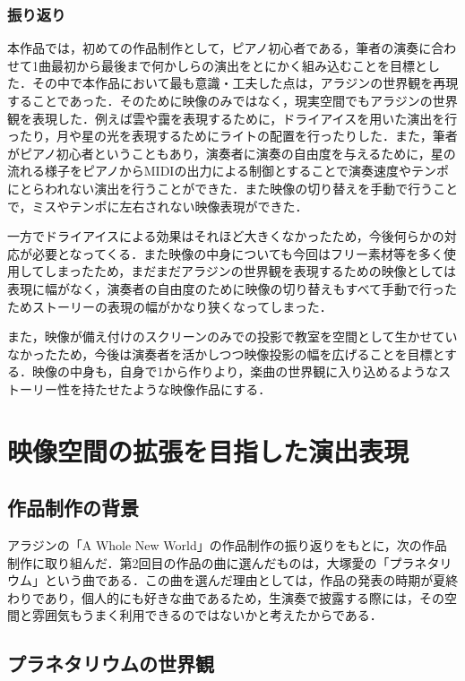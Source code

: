 \subsubsection{振り返り}
本作品では，初めての作品制作として，ピアノ初心者である，筆者の演奏に合わせて1曲最初から最後まで何かしらの演出をとにかく組み込むことを目標とした．その中で本作品において最も意識・工夫した点は，アラジンの世界観を再現することであった．そのために映像のみではなく，現実空間でもアラジンの世界観を表現した．例えば雲や靄を表現するために，ドライアイスを用いた演出を行ったり，月や星の光を表現するためにライトの配置を行ったりした．また，筆者がピアノ初心者ということもあり，演奏者に演奏の自由度を与えるために，星の流れる様子をピアノからMIDIの出力による制御とすることで演奏速度やテンポにとらわれない演出を行うことができた．また映像の切り替えを手動で行うことで，ミスやテンポに左右されない映像表現ができた．

一方でドライアイスによる効果はそれほど大きくなかったため，今後何らかの対応が必要となってくる．また映像の中身についても今回はフリー素材等を多く使用してしまったため，まだまだアラジンの世界観を表現するための映像としては表現に幅がなく，演奏者の自由度のために映像の切り替えもすべて手動で行ったためストーリーの表現の幅がかなり狭くなってしまった．

また，映像が備え付けのスクリーンのみでの投影で教室を空間として生かせていなかったため，今後は演奏者を活かしつつ映像投影の幅を広げることを目標とする．映像の中身も，自身で1から作りより，楽曲の世界観に入り込めるようなストーリー性を持たせたような映像作品にする．


\section{映像空間の拡張を目指した演出表現}
\subsection{作品制作の背景}
アラジンの「A Whole New World」の作品制作の振り返りをもとに，次の作品制作に取り組んだ．第2回目の作品の曲に選んだものは，大塚愛の「プラネタリウム」という曲である\cite{Planetarium}．この曲を選んだ理由としては，作品の発表の時期が夏終わりであり，個人的にも好きな曲であるため，生演奏で披露する際には，その空間と雰囲気もうまく利用できるのではないかと考えたからである．

\subsection{プラネタリウムの世界観}
